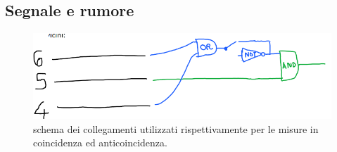 
\subsection{Segnale e rumore}

	\begin{figure}
	\centering
	\includegraphics[width=8 cm]{anti_prov}
	\caption{schema dei collegamenti utilizzati rispettivamente per le misure in coincidenza ed anticoincidenza.}
	\label{anti_prov}
\end{figure}

